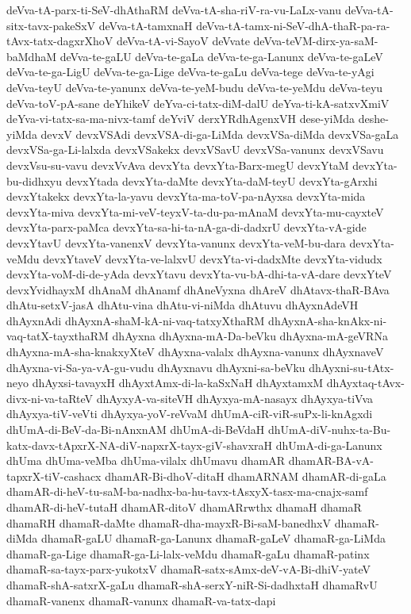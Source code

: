 {deVva-tA-parx-ti-SeV-dhAthaRM
deVva-tA-sha-riV-ra-vu-LaLx-vanu
deVva-tA-sitx-tavx-pakeSxV
deVva-tA-tamxnaH
deVva-tA-tamx-ni-SeV-dhA-thaR-pa-ra-tAvx-tatx-dagxrXhoV
deVva-tA-vi-SayoV
deVvate
deVva-teVM-dirx-ya-saM-baMdhaM
deVva-te-gaLU
deVva-te-gaLa
deVva-te-ga-Lanunx
deVva-te-gaLeV
deVva-te-ga-LigU
deVva-te-ga-Lige
deVva-te-gaLu
deVva-tege
deVva-te-yAgi
deVva-teyU
deVva-te-yanunx
deVva-te-yeM-budu
deVva-te-yeMdu
deVva-teyu
deVva-toV-pA-sane
deYhikeV
deYva-ci-tatx-diM-dalU
deYva-ti-kA-satxvXmiV
deYva-vi-tatx-sa-ma-nivx-tamf
deYviV
derxYRdhAgenxVH
dese-yiMda
deshe-yiMda
devxV
devxVSAdi
devxVSA-di-ga-LiMda
devxVSa-diMda
devxVSa-gaLa
devxVSa-ga-Li-lalxda
devxVSakekx
devxVSavU
devxVSa-vanunx
devxVSavu
devxVsu-su-vavu
devxVvAva
devxYta
devxYta-Barx-megU
devxYtaM
devxYta-bu-didhxyu
devxYtada
devxYta-daMte
devxYta-daM-teyU
devxYta-gArxhi
devxYtakekx
devxYta-la-yavu
devxYta-ma-toV-pa-nAyxsa
devxYta-mida
devxYta-miva
devxYta-mi-veV-teyxV-ta-du-pa-mAnaM
devxYta-mu-cayxteV
devxYta-parx-paMca
devxYta-sa-hi-ta-nA-ga-di-dadxrU
devxYta-vA-gide
devxYtavU
devxYta-vanenxV
devxYta-vanunx
devxYta-veM-bu-dara
devxYta-veMdu
devxYtaveV
devxYta-ve-lalxvU
devxYta-vi-dadxMte
devxYta-vidudx
devxYta-voM-di-de-yAda
devxYtavu
devxYta-vu-bA-dhi-ta-vA-dare
devxYteV
devxYvidhayxM
dhAnaM
dhAnamf
dhAneVyxna
dhAreV
dhAtavx-thaR-BAva
dhAtu-setxV-jasA
dhAtu-vina
dhAtu-vi-niMda
dhAtuvu
dhAyxnAdeVH
dhAyxnAdi
dhAyxnA-shaM-kA-ni-vaq-tatxyXthaRM
dhAyxnA-sha-knAkx-ni-vaq-tatX-tayxthaRM
dhAyxna
dhAyxna-mA-Da-beVku
dhAyxna-mA-geVRNa
dhAyxna-mA-sha-knakxyXteV
dhAyxna-valalx
dhAyxna-vanunx
dhAyxnaveV
dhAyxna-vi-Sa-ya-vA-gu-vudu
dhAyxnavu
dhAyxni-sa-beVku
dhAyxni-su-tAtx-neyo
dhAyxsi-tavayxH
dhAyxtAmx-di-la-kaSxNaH
dhAyxtamxM
dhAyxtaq-tAvx-divx-ni-va-taRteV
dhAyxyA-va-siteVH
dhAyxya-mA-nasayx
dhAyxya-tiVva
dhAyxya-tiV-veVti
dhAyxya-yoV-reVvaM
dhUmA-ciR-viR-suPx-li-knAgxdi
dhUmA-di-BeV-da-Bi-nAnxnAM
dhUmA-di-BeVdaH
dhUmA-diV-nuhx-ta-Bu-katx-davx-tApxrX-NA-diV-napxrX-tayx-giV-shavxraH
dhUmA-di-ga-Lanunx
dhUma
dhUma-veMba
dhUma-vilalx
dhUmavu
dhamAR
dhamAR-BA-vA-tapxrX-tiV-cashacx
dhamAR-Bi-dhoV-ditaH
dhamARNAM
dhamAR-di-gaLa
dhamAR-di-heV-tu-saM-ba-nadhx-ba-hu-tavx-tAsxyX-tasx-ma-cnajx-samf
dhamAR-di-heV-tutaH
dhamAR-ditoV
dhamARrwthx
dhamaH
dhamaR
dhamaRH
dhamaR-daMte
dhamaR-dha-mayxR-Bi-saM-banedhxV
dhamaR-diMda
dhamaR-gaLU
dhamaR-ga-Lanunx
dhamaR-gaLeV
dhamaR-ga-LiMda
dhamaR-ga-Lige
dhamaR-ga-Li-lalx-veMdu
dhamaR-gaLu
dhamaR-patinx
dhamaR-sa-tayx-parx-yukotxV
dhamaR-satx-sAmx-deV-vA-Bi-dhiV-yateV
dhamaR-shA-satxrX-gaLu
dhamaR-shA-serxY-niR-Si-dadhxtaH
dhamaRvU
dhamaR-vanenx
dhamaR-vanunx
dhamaR-va-tatx-dapi
}
